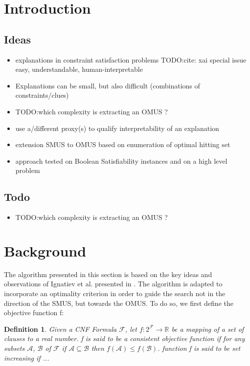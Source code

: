 \documentclass{article}
\newcommand\m[1]{\mathcal{#1}}
\newtheorem{definition}[thm]{Definition}
\newcommand\comment[1]{\marginpar{\tiny #1}}
\renewcommand\comment[1]{#1}
\newcommand{\emilio}[1]{{\comment{\color{red}#1}}}
\newcommand{\todo}[1]{{\comment{\color{red}\textsc{TODO:}#1}}}
\begin{document}
\section{Introduction}
\subsection{Ideas}
\begin{itemize}
  \item explanations in constraint satisfaction problems \todo{cite: xai special issue} easy, understandable, human-interpretable
  \item Explanations can be small, but also difficult (combinations of constraints/clues)
  \item \todo{which complexity is extracting an OMUS ?}
  \item use a/different proxy(s) to qualify interpretability of an explanation
  \item extension SMUS to OMUS based on enumeration of optimal hitting set
  \item approach tested on Boolean Satisfiability instances and on a high level problem
\end{itemize}
\subsection{Todo}
\begin{itemize}
  \item \todo{which complexity is extracting an OMUS ?}
\end{itemize}

\section{Background}

The algorithm presented in this section is based on the key ideas and observations of Ignatiev et al. presented in \cite{ignatiev2015smallest}.
The algorithm is adapted to incorporate an optimality criterion in order to guide the search not in the direction of the SMUS, but towards the OMUS. 
To do so, we first define the  objective function f:

\begin{definition}
  Given a CNF Formula $\m{F}$, let $f : 2^{\m{F}} \rightarrow \mathbb{R}$ be a mapping of a set of clauses to a real number. f is said to be a \textit{consistent} objective function if for any subsets $\m{A}$, $\m{B}$ of $\m{F}$ if $\m{A} \subseteq \m{B}$ then $f(\m{A}) \leq f(\m{B})$.
  \emilio{function f is said to be set increasing if ...}
\end{definition}
\end{document}
